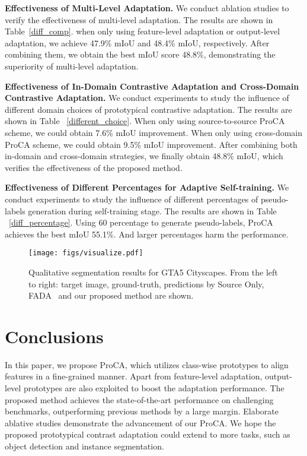 \documentclass[runningheads]{llncs}
\begin{document}
\noindent \textbf{Effectiveness of Multi-Level Adaptation.} We conduct ablation studies to verify the effectiveness of multi-level adaptation. The results are shown in Table~\ref{diff_comp}. when only using feature-level adaptation or output-level adaptation, we achieve 47.9\% mIoU and 48.4\% mIoU, respectively. After combining them, we obtain the best mIoU score 48.8\%, demonstrating the superiority of multi-level adaptation. 

\noindent \textbf{Effectiveness of In-Domain Contrastive Adaptation and Cross-Domain Contrastive Adaptation.} We conduct experiments to study the influence of different domain choices of prototypical contrastive adaptation. The results are shown in Table ~\ref{different_choice}. When only using source-to-source ProCA scheme, we could obtain 7.6\% mIoU improvement. When only using cross-domain ProCA scheme, we could obtain 9.5\% mIoU improvement. After combining both in-domain and cross-domain strategies, we finally obtain 48.8\% mIoU, which verifies the effectiveness of the proposed method.

\noindent \textbf{Effectiveness of Different Percentages for Adaptive Self-training.} We conduct experiments to study the influence of different percentages of pseudo-labels generation during self-training stage. The results are shown in Table ~\ref{diff_percentage}. Using 60 percentage to generate pseudo-labels, ProCA achieves the best mIoU 55.1\%. And larger percentages harm the performance.

\begin{figure*}[t]
\centering
\texttt{[image: figs/visualize.pdf]}
\caption{Qualitative segmentation results for GTA5  Cityscapes. From the left to right: target image, ground-truth, predictions by Source Only, FADA~\cite{wang2020classes} and our proposed method are shown.}
\label{visualize}
\end{figure*}

\section{Conclusions}
In this paper, we propose ProCA, which utilizes class-wise prototypes to align features in a fine-grained manner. Apart from feature-level adaptation, output-level prototypes are also exploited to boost the adaptation performance. The proposed method achieves the state-of-the-art performance on challenging benchmarks, outperforming previous methods by a large margin. Elaborate ablative studies demonstrate the advancement of our ProCA. We hope the proposed prototypical contrast adaptation could extend to more tasks, such as object detection and instance segmentation.

















 

\clearpage


\end{document}
